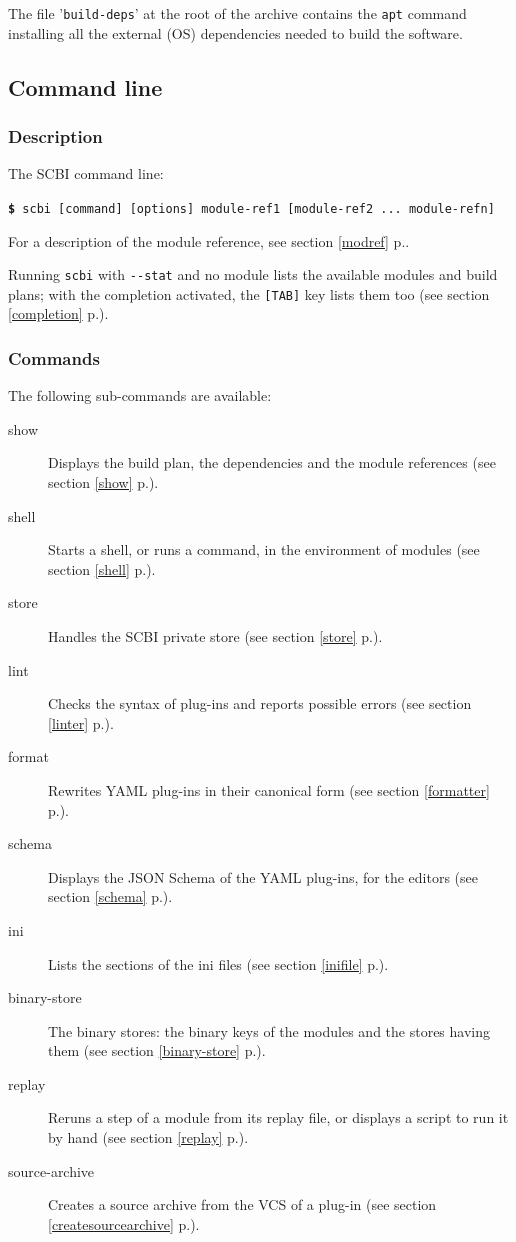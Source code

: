\documentclass[a4paper,12pt,twoside]{article}
\newcommand{\code}[1]{\texttt{#1}}
\newcommand{\seeref}[1]{see section \ref{#1} p.\pageref{#1}}
\newcommand{\file}[1]{'{\texttt{#1}}'}
\newcommand{\cmd}[1]{\tabto{1cm}\hspace{0.5cm}\texttt{\textbf{\$} #1}}
\newcommand{\ddash}{-{}-}
\begin{document}
The file \file{build-deps} at the root of the archive contains the \code{apt} command installing all the external (OS) dependencies needed to build the software.

\subsection{Command line}

\subsubsection{Description}

The SCBI command line:

\cmd{scbi [command] [options] module-ref1 [module-ref2 ... module-refn]}

For a description of the module reference, \seeref{modref}.

Running \code{scbi} with \code{\ddash{}stat} and no module lists the available modules and build plans; with the completion activated, the \code{[TAB]} key lists them too (\seeref{completion}).

\subsubsection{Commands}
\label{cmdline}

The following sub-commands are available:

\begin{description}
	\item[show] Displays the build plan, the dependencies and the module references (\seeref{show}).

	\item[shell] Starts a shell, or runs a command, in the environment of modules (\seeref{shell}).

	\item[store] Handles the SCBI private store (\seeref{store}).

	\item[lint] Checks the syntax of plug-ins and reports possible errors (\seeref{linter}).

	\item[format] Rewrites YAML plug-ins in their canonical form (\seeref{formatter}).

	\item[schema] Displays the JSON Schema of the YAML plug-ins, for the editors (\seeref{schema}).

	\item[ini] Lists the sections of the ini files (\seeref{inifile}).

	\item[binary-store] The binary stores: the binary keys of the modules and the stores having them (\seeref{binary-store}).

	\item[replay] Reruns a step of a module from its replay file, or displays a script to run it by hand (\seeref{replay}).

	\item[source-archive] Creates a source archive from the VCS of a plug-in (\seeref{createsourcearchive}).
\end{description}
\end{document}
